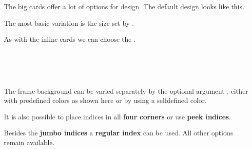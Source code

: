 \documentclass[11pt,english,BCOR10mm,DIV12,bibliography=totoc,parskip=false,smallheadings,
    headexclude,footexclude,oneside]{pst-doc}
\begin{document}
The big cards offer a lot of options for design. The default design looks like this.
\begin{center}
\crdAs
\crdtenh
\crdsevd
\crdsevc
\crdQd
\end{center}

The most basic variation is the \textsf{size} set by .

\begin{LTXexample}[pos=t]
\crdAs
{}
\crdtenh
{}
\crdsevd
{}
\crdsevc
{}
\crdQd
\end{LTXexample}

As with the inline cards we can choose the .

\begin{LTXexample}[pos=t]
\crdAs
\crdtenh
\crdsevd
\crdsevc
\crdQd\\
\crdAs
\crdtenh
\crdsevd
\crdsevc
\crdQd\\
\crdAs
\crdtenh
\crdsevd
\crdsevc
\crdQd\\
\crdAs
\crdtenh
\crdsevd
\crdsevc
\crdQd
\end{LTXexample}

The \textsf{frame background} can be varied separately by the optional
argument , either with predefined colors as shown here or by using a selfdefined color.

\begin{LTXexample}[pos=t]
\crdAs
{}\crdtenh
{}\crdsevd
{}\crdsevc
{}\crdQd
\end{LTXexample}

It is also possible to place indices in all \textbf{four corners} or use \textbf{peek indices}.

\begin{LTXexample}[pos=t]
\crdAs
{}\crdtenh
{}\crdsevd
{}\crdsevc
{}\crdQd
\end{LTXexample}


Besides the \textbf{jumbo indices} a \textbf{regular index} can be used. All other options remain available.

\begin{LTXexample}[pos=t]
\crdAs
{}\crdtenh
{}\crdsevd
{}\crdsevc
{}\crdQd
\end{LTXexample}
\end{document}
